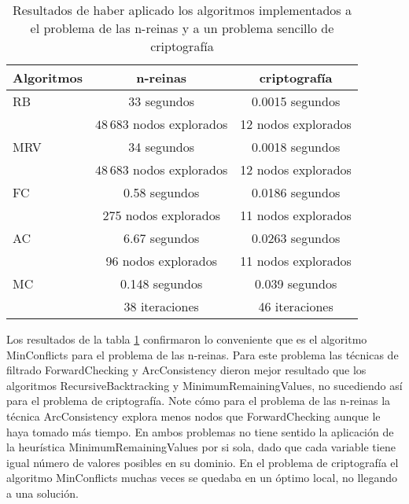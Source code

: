 \begin{table}[h]
	\caption{Resultados de haber aplicado los algoritmos implementados a el problema de las n-reinas y a un problema sencillo de criptograf\'ia}
	\begin{center}
		\label{2problemas}
		\begin{tabular}{|l|c|c||}
			\hline \hline
			Algoritmos & n-reinas & criptograf\'ia \\ \hline
			RB & 33 segundos & 0.0015 segundos \\
			 & $48\,683$ nodos explorados & 12 nodos explorados \\ \hline
			MRV & 34 segundos &  0.0018 segundos \\
			 & $48\,683$ nodos explorados & 12 nodos explorados \\ \hline
			FC & 0.58 segundos & 0.0186 segundos \\
			 & 275 nodos explorados & 11 nodos explorados \\ \hline
			AC & 6.67 segundos &  0.0263 segundos \\
			 & 96 nodos explorados & 11 nodos explorados \\ \hline
			MC & 0.148 segundos & 0.039 segundos \\
			 & 38 iteraciones & 46 iteraciones \\ \hline
		\end{tabular}
	\end{center}
\end{table}

Los resultados de la tabla \ref{2problemas} confirmaron lo conveniente que es el algoritmo \textsf{MinConflicts} para el problema de las n-reinas. Para este problema las t\'ecnicas de filtrado \textsf{ForwardChecking} y \textsf{ArcConsistency} dieron mejor resultado que los algoritmos \textsf{RecursiveBacktracking} y \textsf{MinimumRemainingValues}, no sucediendo as\'i para el problema de criptograf\'ia. Note c\'omo para el problema de las n-reinas la t\'ecnica \textsf{ArcConsistency} explora menos nodos que \textsf{ForwardChecking} aunque le haya tomado m\'as tiempo. En ambos problemas no tiene sentido la aplicaci\'on de la heur\'istica \textsf{MinimumRemainingValues} por si sola, dado que cada variable tiene igual n\'umero de valores posibles en su dominio. En el problema de criptograf\'ia el algoritmo \textsf{MinConflicts} muchas veces se quedaba en un \'optimo local, no llegando a una soluci\'on.

